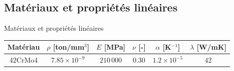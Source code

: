 \subsection{Matériaux et propriétés linéaires}
\label{sec:Matériaux et propriétés linéaires}

\begin{frame}[c]{Matériaux et propriétés linéaires}
    \vspace{10pt}
    \centering
    \begin{tabular}{cccccc}
        \toprule
        Matériau & $\rho$ [ton/mm$^3$] & $E$ [MPa] & $\nu$ [-] & $\alpha$ [K$^{-1}$] & $\lambda$ [W/mK] \\
        \midrule
        42CrMo4 & $7.85\times10^{-9}$ & $210\,000$ & 0.30 & $1.2\times10^{-5}$ & 42 \\
    \bottomrule
    \end{tabular}
\end{frame}